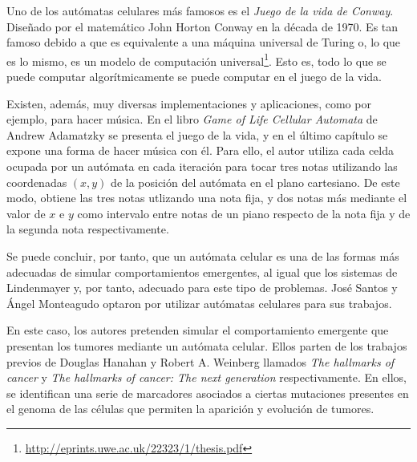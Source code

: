 Uno de los autómatas celulares más famosos es el \textit{Juego de la vida de Conway}.
Diseñado por el matemático John Horton Conway en la década de 1970. Es tan famoso debido a
que es equivalente a una máquina universal de Turing o, lo que es lo mismo, es un modelo de computación universal\footnote{\url{http://eprints.uwe.ac.uk/22323/1/thesis.pdf}}.
Esto es, todo lo que se puede computar algorítmicamente se puede computar en el juego de la vida.

Existen, además, muy diversas implementaciones y aplicaciones, como por ejemplo, para hacer música.
En el libro \textit{Game of Life Cellular Automata} de Andrew Adamatzky \cite{game-of-life} se presenta
el juego de la vida, y en el último capítulo se expone una forma de hacer música con él. Para ello, el autor
utiliza cada celda ocupada por un autómata en cada iteración para tocar tres notas utilizando
las coordenadas $(x,y)$ de la posición del autómata en el plano cartesiano. De este modo,
obtiene las tres notas utlizando una nota fija, y dos notas más mediante el valor de
$x$ e $y$ como intervalo entre notas de un piano respecto de la nota fija y de la segunda nota
respectivamente.

Se puede concluir, por tanto, que un autómata celular es una de las formas más adecuadas de simular comportamientos emergentes,
al igual que los sistemas de Lindenmayer y, por tanto, adecuado para este tipo de problemas.
José Santos y Ángel Monteagudo \cite{jsantos-amonteagudo-1-2014} optaron por utilizar autómatas celulares para sus trabajos.

En este caso, los autores pretenden simular el comportamiento emergente que presentan los
tumores mediante un autómata celular. Ellos parten de los trabajos previos de Douglas Hanahan y Robert A. Weinberg
llamados \textit{The hallmarks of cancer} \cite{hanahan-weinberg-2000} y \textit{The hallmarks of cancer: The next generation} \cite{hanahan-weinberg-2011}
respectivamente. En ellos, se identifican una serie de marcadores asociados a ciertas mutaciones presentes
en el genoma de las células que permiten la aparición y evolución de tumores.
